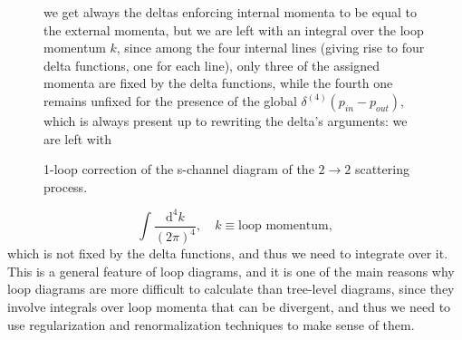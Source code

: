 \begin{figure}[H]
\begin{minipage}{0.5\textwidth}
        \caption{1-loop correction of the s-channel diagram of the \(2 \to 2\) scattering process.}
        \label{fig:1loop_propagator}
    \end{minipage}
    \hfill
    \begin{minipage}{0.45\textwidth}
        we get always the deltas enforcing internal momenta to be equal to the external momenta, but we are left with an integral over the loop momentum \(k\), since among the four internal lines (giving rise to four delta functions, one for each line), only three of the assigned momenta are fixed by the delta functions, while the fourth one remains unfixed for the presence of the global \(\delta^{(4)}(p_{in} - p_{out})\), which is always present up to rewriting the delta's arguments: we are left with
    \end{minipage}
\end{figure}
\[
    \int \frac{\mathrm{d}^4 k}{(2\pi)^4}, \quad k \equiv \text{loop momentum},
\]
which is not fixed by the delta functions, and thus we need to integrate over it. This is a general feature of loop diagrams, and it is one of the main reasons why loop diagrams are more difficult to calculate than tree-level diagrams, since they involve integrals over loop momenta that can be divergent, and thus we need to use regularization and renormalization techniques to make sense of them.

